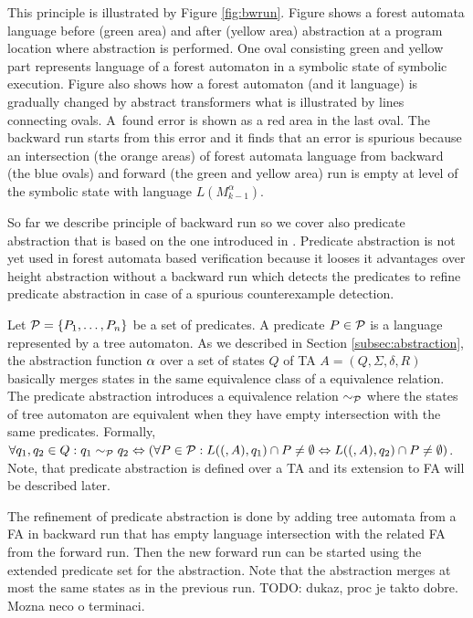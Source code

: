 This principle is illustrated by Figure \ref{fig:bwrun}.
Figure shows a forest automata language before (green area)
and after (yellow area) abstraction at a program location where abstraction is performed.
One oval consisting green and yellow part represents language of a forest automaton
in a symbolic state of symbolic execution.
Figure also shows how a forest automaton (and it language) is gradually changed
by abstract transformers what is illustrated by lines connecting ovals.
A~found error is shown as a red area in the last oval.
The backward run starts from this error and it finds
that an error is spurious because an intersection (the orange areas) of
forest automata language from backward (the blue ovals) and forward
(the green and yellow area) run is empty at level of the symbolic state
with language $L(M^{\alpha}_{k-1})$.

So far we describe principle of backward run so we cover
also predicate abstraction that is based on the one introduced
in \cite{artmc}.
Predicate abstraction is not yet used in forest automata based verification
because it looses it advantages over height abstraction without
a backward run which detects the predicates to refine predicate abstraction
in case of a spurious counterexample detection.

Let $\mathcal{P}=\{P_1, \ldots, P_n\}$ be a set of predicates.
A predicate $P \in \mathcal{P}$ is a language represented by
a tree automaton.
As we described in Section \ref{subsec:abstraction}, the abstraction function $\alpha$
over a set of states $Q$ of TA $A=(Q,\Sigma,\delta, R)$ basically
merges states in the same equivalence class of a equivalence relation.
The predicate abstraction introduces a equivalence relation $\sim_{\mathcal{P}}$
where the states of tree automaton are equivalent when
they have empty intersection with the same predicates.
Formally, $\forall q_1,q_2 \in Q: q_1 \sim_{\mathcal{P}} q_2 \Leftrightarrow
(\forall P \in \mathcal{P}: L((,A),q_1) \cap P \neq \emptyset
\Leftrightarrow L((,A), q_2) \cap P \neq \emptyset)$.
Note, that predicate abstraction is defined over a TA
and its extension to FA will be described later.

The refinement of predicate abstraction is done by adding
tree automata from a FA in backward run that has empty language
intersection with the related FA from the forward run.
Then the new forward run can be started using the extended predicate
set for the abstraction.
Note that the abstraction merges at most the same states as
in the previous run.
TODO: dukaz, proc je takto dobre.
Mozna neco o terminaci.

